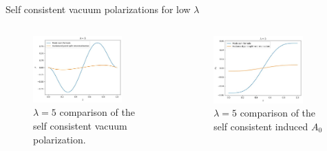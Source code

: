 \begin{frame}{Self consistent vacuum polarizations for low $\lambda$}
	\begin{columns}
	    \begin{column}{0.5\textwidth}
	    \begin{figure}[h]
	    	\centering
	    	\includegraphics[width=0.8\textwidth]{figures/low-lambda-vacuum-polarization.png}
	    	\caption{$\lambda=5$ comparison of the self consistent vacuum polarization.}
	    	\label{fig:figures-}
	    \end{figure}
	    \end{column}
	    \begin{column}{0.5\textwidth}
	    \begin{figure}[h]
	    	\centering
	    	\includegraphics[width=0.8\textwidth]{figures/low-lambda-induced-A0.png}
	    	\caption{$\lambda=5$ comparison of the self consistent induced $A_0$}
	    	\label{fig:figures-}
	    \end{figure}
	    \end{column}
	\end{columns}
\end{frame}
